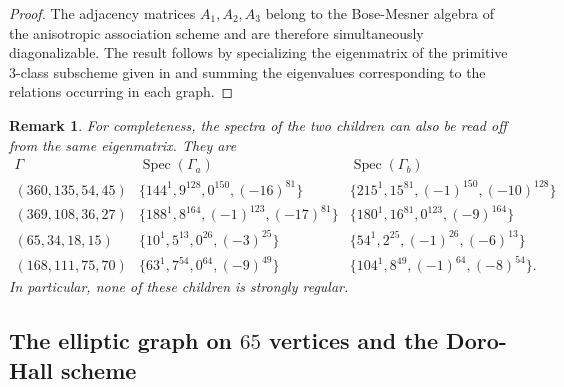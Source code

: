 \documentclass{article}
\theoremstyle{plain}
\newtheorem{rem}[thm]{Remark}
\begin{document}
\begin{proof}
The adjacency matrices $A_1,A_2,A_3$ belong to the Bose-Mesner algebra of the anisotropic association scheme and are therefore simultaneously diagonalizable. The result follows by specializing the
eigenmatrix of the primitive $3$-class subscheme given in \cite[Theorem~4.19 and Remark~4.20]{AdriaensenDeBoeck2025} and summing the eigenvalues corresponding to the relations occurring in each graph.
\end{proof}

\begin{rem}
For completeness, the spectra of the two children can also be read off from the same eigenmatrix. They are
\[
\begin{array}{c|c|c}
\Gamma & \operatorname{Spec}(\Gamma_a)
       & \operatorname{Spec}(\Gamma_b)\\
\hline
(360,135,54,45)
&
\{144^1,9^{128},0^{150},(-16)^{81}\}
&
\{215^1,15^{81},(-1)^{150},(-10)^{128}\}
\\[1mm]
(369,108,36,27)
&
\{188^1,8^{164},(-1)^{123},(-17)^{81}\}
&
\{180^1,16^{81},0^{123},(-9)^{164}\}
\\[1mm]
(65,34,18,15)
&
\{10^1,5^{13},0^{26},(-3)^{25}\}
&
\{54^1,2^{25},(-1)^{26},(-6)^{13}\}
\\[1mm]
(168,111,75,70)
&
\{63^1,7^{54},0^{64},(-9)^{49}\}
&
\{104^1,8^{49},(-1)^{64},(-8)^{54}\}.
\end{array}
\]
In particular, none of these children is strongly regular.
\end{rem}



\subsection{The elliptic graph on $65$ vertices and the Doro-Hall scheme}
\end{document}
